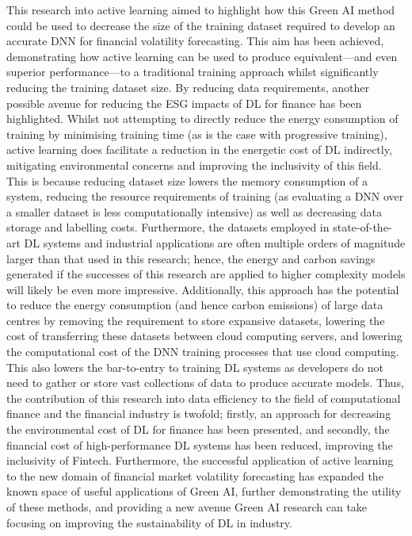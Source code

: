 \documentclass[a4paper, 11pt]{report}
\begin{document}
    This research into active learning aimed to highlight how this Green AI method could be used to decrease the size of the training dataset required to develop an accurate DNN for financial volatility forecasting. This aim has been achieved, demonstrating how active learning can be used to produce equivalent---and even superior performance---to a traditional training approach whilst significantly reducing the training dataset size. By reducing data requirements, another possible avenue for reducing the ESG impacts of DL for finance has been highlighted. Whilst not attempting to directly reduce the energy consumption of training by minimising training time (as is the case with progressive training), active learning does facilitate a reduction in the energetic cost of DL indirectly, mitigating environmental concerns and improving the inclusivity of this field. This is because reducing dataset size lowers the memory consumption of a system, reducing the resource requirements of training (as evaluating a DNN over a smaller dataset is less computationally intensive) as well as decreasing data storage and labelling costs. Furthermore, the datasets employed in state-of-the-art DL systems and industrial applications are often multiple orders of magnitude larger than that used in this research; hence, the energy and carbon savings generated if the successes of this research are applied to higher complexity models will likely be even more impressive. Additionally, this approach has the potential to reduce the energy consumption (and hence carbon emissions) of large data centres by removing the requirement to store expansive datasets, lowering the cost of transferring these datasets between cloud computing servers, and lowering the computational cost of the DNN training processes that use cloud computing. This also lowers the bar-to-entry to training DL systems as developers do not need to gather or store vast collections of data to produce accurate models. Thus, the contribution of this research into data efficiency to the field of computational finance and the financial industry is twofold; firstly, an approach for decreasing the environmental cost of DL for finance has been presented, and secondly, the financial cost of high-performance DL systems has been reduced, improving the inclusivity of Fintech. Furthermore, the successful application of active learning to the new domain of financial market volatility forecasting has expanded the known space of useful applications of Green AI, further demonstrating the utility of these methods, and providing a new avenue Green AI research can take focusing on improving the sustainability of DL in industry.
\end{document}
